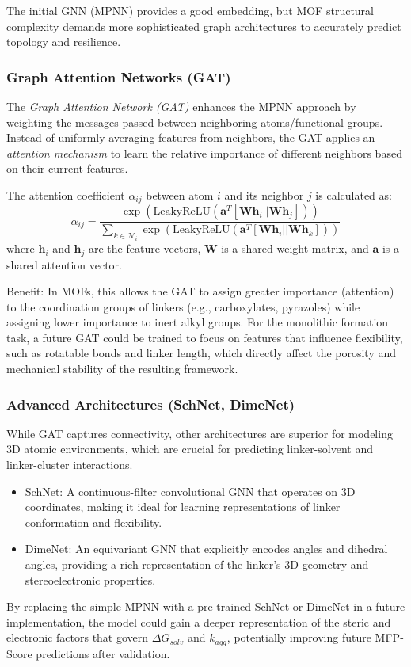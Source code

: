 \documentclass[12pt,a4paper]{article}
\begin{document}
The initial GNN (MPNN) provides a good embedding, but MOF structural complexity demands more sophisticated graph architectures to accurately predict topology and resilience.

\subsubsection{Graph Attention Networks (GAT)}

The \textit{Graph Attention Network (GAT)} enhances the MPNN approach by weighting the messages passed between neighboring atoms/functional groups. Instead of uniformly averaging features from neighbors, the GAT applies an \textit{attention mechanism} to learn the relative importance of different neighbors based on their current features.

The attention coefficient $\alpha_{ij}$ between atom $i$ and its neighbor $j$ is calculated as:
\[
\alpha_{ij} = \frac{\exp(\text{LeakyReLU}(\mathbf{a}^T [\mathbf{W}\mathbf{h}_i || \mathbf{W}\mathbf{h}_j]))}{\sum_{k \in \mathcal{N}_i} \exp(\text{LeakyReLU}(\mathbf{a}^T [\mathbf{W}\mathbf{h}_i || \mathbf{W}\mathbf{h}_k]))}
\]
where $\mathbf{h}_i$ and $\mathbf{h}_j$ are the feature vectors, $\mathbf{W}$ is a shared weight matrix, and $\mathbf{a}$ is a shared attention vector.

Benefit: In MOFs, this allows the GAT to assign greater importance (attention) to the coordination groups of linkers (e.g., carboxylates, pyrazoles) while assigning lower importance to inert alkyl groups. For the monolithic formation task, a future GAT could be trained to focus on features that influence flexibility, such as rotatable bonds and linker length, which directly affect the porosity and mechanical stability of the resulting framework.

\subsubsection{Advanced Architectures (SchNet, DimeNet)}

While GAT captures connectivity, other architectures are superior for modeling 3D atomic environments, which are crucial for predicting linker-solvent and linker-cluster interactions.
\begin{itemize}
    \item SchNet: A continuous-filter convolutional GNN that operates on 3D coordinates, making it ideal for learning representations of linker conformation and flexibility.\cite{ref21}
    \item DimeNet: An equivariant GNN that explicitly encodes angles and dihedral angles, providing a rich representation of the linker's 3D geometry and stereoelectronic properties.\cite{ref22}
\end{itemize}
By replacing the simple MPNN with a pre-trained SchNet or DimeNet in a future implementation, the model could gain a deeper representation of the steric and electronic factors that govern $\Delta G_{solv}$ and $k_{agg}$, potentially improving future MFP-Score predictions after validation.
\end{document}

